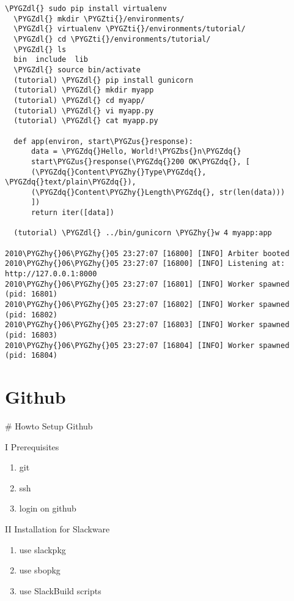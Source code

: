 \documentclass[letterpaper,10pt,english]{sphinxmanual}
\def\PYGZbs{\char`\\}
\def\PYGZus{\char`\_}
\def\PYGZdl{\char`\$}
\def\PYGZhy{\char`\-}
\def\PYGZdq{\char`\"}
\def\PYGZti{\char`\~}
\begin{document}
\begin{Verbatim}[commandchars=\\\{\}]
  \PYGZdl{} sudo pip install virtualenv
  \PYGZdl{} mkdir \PYGZti{}/environments/
  \PYGZdl{} virtualenv \PYGZti{}/environments/tutorial/
  \PYGZdl{} cd \PYGZti{}/environments/tutorial/
  \PYGZdl{} ls
  bin  include  lib
  \PYGZdl{} source bin/activate
  (tutorial) \PYGZdl{} pip install gunicorn
  (tutorial) \PYGZdl{} mkdir myapp
  (tutorial) \PYGZdl{} cd myapp/
  (tutorial) \PYGZdl{} vi myapp.py
  (tutorial) \PYGZdl{} cat myapp.py

  def app(environ, start\PYGZus{}response):
      data = \PYGZdq{}Hello, World!\PYGZbs{}n\PYGZdq{}
      start\PYGZus{}response(\PYGZdq{}200 OK\PYGZdq{}, [
      (\PYGZdq{}Content\PYGZhy{}Type\PYGZdq{}, \PYGZdq{}text/plain\PYGZdq{}),
      (\PYGZdq{}Content\PYGZhy{}Length\PYGZdq{}, str(len(data)))
      ])
      return iter([data])

  (tutorial) \PYGZdl{} ../bin/gunicorn \PYGZhy{}w 4 myapp:app

2010\PYGZhy{}06\PYGZhy{}05 23:27:07 [16800] [INFO] Arbiter booted 
2010\PYGZhy{}06\PYGZhy{}05 23:27:07 [16800] [INFO] Listening at: http://127.0.0.1:8000 
2010\PYGZhy{}06\PYGZhy{}05 23:27:07 [16801] [INFO] Worker spawned (pid: 16801) 
2010\PYGZhy{}06\PYGZhy{}05 23:27:07 [16802] [INFO] Worker spawned (pid: 16802) 
2010\PYGZhy{}06\PYGZhy{}05 23:27:07 [16803] [INFO] Worker spawned (pid: 16803) 
2010\PYGZhy{}06\PYGZhy{}05 23:27:07 [16804] [INFO] Worker spawned (pid: 16804)
\end{Verbatim}


\section{Github}
\label{sdocs/github/github:github}\label{sdocs/github/github::doc}
\# Howto Setup Github

I Prerequisites
\begin{enumerate}
\item {} 
git

\item {} 
ssh

\item {} 
login on github

\end{enumerate}

II Installation for Slackware
\begin{enumerate}
\item {} 
use slackpkg

\item {} 
use sbopkg

\item {} 
use SlackBuild scripts

\end{enumerate}
\end{document}
